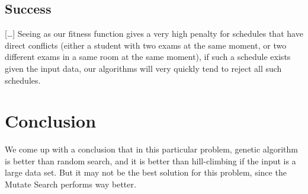 \documentclass[letterpaper]{article}
\begin{document}
  \subsection{Success}
    [\ldots]
    Seeing as our fitness function gives a very high penalty for schedules that have direct
    conflicts (either a student with two exams at the same moment, or two different exams
    in a same room at the same moment), if such a schedule exists given the input data, our
    algorithms will very quickly tend to reject all such schedules.
  
\section{Conclusion}
  We come up with a conclusion that in this particular problem, genetic algorithm
  is better than random search, and it is better than hill-climbing if the input 
  is a large data set. But it may not be the best solution for this problem, since
  the Mutate Search performs way better.
  


\end{document}
